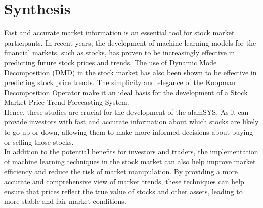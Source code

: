 \section{Synthesis}
\label{sec:synthesis}
Fast and accurate market information is an essential tool 
for stock market participants. In recent years, the development 
of machine learning models for the financial markets, such as stocks, 
has proven to be increasingly effective in predicting future stock prices and trends. 
The use of Dynamic Mode Decomposition (DMD) in the stock market has also been shown 
to be effective in predicting stock price trends. The simplicity and elegance of 
the Koopman Decomposition Operator make it an ideal basis for the development of 
a Stock Market Price Trend Forecasting System.
\hfill \\

Hence, these studies are crucial for the development of the alamSYS. As it can
provide investors with fast and accurate information about which stocks are 
likely to go up or down, allowing them to make more informed decisions about 
buying or selling those stocks.
\hfill \\

In addition to the potential benefits for investors and traders, the 
implementation of machine learning techniques in the stock market can also 
help improve market efficiency and reduce the risk of market manipulation. 
By providing a more accurate and comprehensive view of market trends, 
these techniques can help ensure that prices reflect the true value of 
stocks and other assets, leading to more stable and fair market conditions.